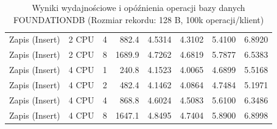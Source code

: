 \begin{table}[ht]
{\begin{tabular}{llcrrrrr}
Zapis (Insert) & 2 CPU & 4 & 882.4 & 4.5314 & 4.3102 & 5.4100 & 6.8920 \\
Zapis (Insert) & 2 CPU & 8 & 1689.9 & 4.7262 & 4.6819 & 5.7877 & 6.5383 \\
Zapis (Insert) & 4 CPU & 1 & 240.8 & 4.1523 & 4.0065 & 4.6899 & 5.5168 \\
Zapis (Insert) & 4 CPU & 2 & 482.4 & 4.1462 & 4.0864 & 4.7484 & 5.1971 \\
Zapis (Insert) & 4 CPU & 4 & 868.8 & 4.6024 & 4.5083 & 5.6100 & 6.3486 \\
Zapis (Insert) & 4 CPU & 8 & 1647.1 & 4.8495 & 4.7404 & 5.8900 & 6.8998 \\
\bottomrule
\end{tabular}%
}
\caption{Wyniki wydajnościowe i opóźnienia operacji bazy danych FOUNDATIONDB (Rozmiar rekordu: 128 B, 100k operacji/klient)}
\label{tab:latency_foundationdb_small_100000}
\end{table}

